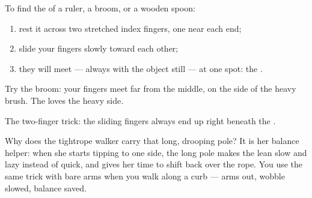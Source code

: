 \begin{method}\label{met:g2:balance-equilibrium:find}
To find the  of a ruler, a broom, or a wooden spoon:
\begin{enumerate}
  \item rest it across two stretched index fingers, one near each
        end;
  \item slide your fingers slowly toward each other;
  \item they will meet --- always with the object still  ---
        at one spot: the .
\end{enumerate}
Try the broom: your fingers meet far from the middle, on the side of
the heavy brush. The  loves the heavy side.
\end{method}

\begin{omfigure}

{\small The two-finger trick: the sliding fingers always end up
right beneath the .}
\end{omfigure}

\begin{example}\label{ex:g2:balance-equilibrium:acrobat}
Why does the tightrope walker carry that long, drooping pole? It is
her balance helper: when she starts tipping to one side, the long
pole makes the lean slow and lazy instead of quick, and gives her
time to shift back over the rope. You use the same trick with bare
arms when you walk along a curb --- arms out, wobble slowed, balance
saved.
\end{example}

